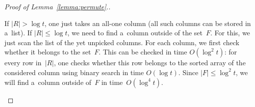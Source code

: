 \begin{proof}[Proof of Lemma~\ref{lemma:permute}.]
\begin{description}
If $|R| > \log t$, one just takes an all-one column (all such columns
can be stored in a~list). If $|R| \le \log t$, we need to find a~column outside of the set~$F$. For this, we just scan the list of the yet unpicked columns. For each column, we first check whether it belongs to the set~$F$. This can be checked in time $O(\log^2t)$: for every row in~$|R|$, one checks whether this row belongs to the sorted array of the considered column using binary search in time
$O(\log t)$. Since $|F| \le \log^2t$, we will find a~column outside of~$F$ in time~$O(\log^4 t)$.
\end{description}

\end{proof}



